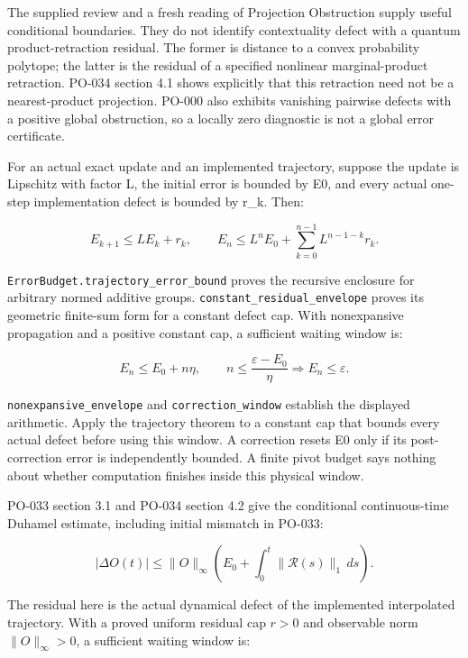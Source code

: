 \documentclass[
  10pt,
]{article}
\begin{document}
The supplied review and a fresh reading of Projection Obstruction supply useful conditional boundaries. They do not identify contextuality defect with a quantum product-retraction residual. The former is distance to a convex probability polytope; the latter is the residual of a specified nonlinear marginal-product retraction. PO-034 section 4.1 shows explicitly that this retraction need not be a nearest-product projection. PO-000 also exhibits vanishing pairwise defects with a positive global obstruction, so a locally zero diagnostic is not a global error certificate.

For an actual exact update and an implemented trajectory, suppose the update is Lipschitz with factor L, the initial error is bounded by E0, and every actual one-step implementation defect is bounded by r\_k. Then:

\protect\hypertarget{math-E0023-0029}{}{\[
E_{k+1}\le L E_k+r_k,
\qquad
E_n\le L^n E_0+\sum_{k=0}^{n-1}L^{n-1-k}r_k.
\]}

\texttt{ErrorBudget.trajectory\_error\_bound} proves the recursive enclosure for arbitrary normed additive groups. \texttt{constant\_residual\_envelope} proves its geometric finite-sum form for a constant defect cap. With nonexpansive propagation and a positive constant cap, a sufficient waiting window is:

\protect\hypertarget{math-E0024-0030}{}{\[
E_n\le E_0+n\eta,\qquad
n\le\frac{\varepsilon-E_0}{\eta}\Longrightarrow E_n\le\varepsilon.
\]}

\texttt{nonexpansive\_envelope} and \texttt{correction\_window} establish the displayed arithmetic. Apply the trajectory theorem to a constant cap that bounds every actual defect before using this window. A correction resets E0 only if its post-correction error is independently bounded. A finite pivot budget says nothing about whether computation finishes inside this physical window.

PO-033 section 3.1 and PO-034 section 4.2 give the conditional continuous-time Duhamel estimate, including initial mismatch in PO-033:

\protect\hypertarget{math-E0025-0031}{}{\[
|\Delta O(t)|\le\lVert O\rVert_\infty
\left(E_0+\int_0^t\lVert\mathcal R(s)\rVert_1\,ds\right).
\]}

The residual here is the actual dynamical defect of the implemented interpolated trajectory. With a proved uniform residual cap \protect\hypertarget{math-E0030-0032}{}{\(r>0\)} and observable norm \protect\hypertarget{math-E0031-0033}{}{\(\lVert O\rVert_\infty>0\)}, a sufficient waiting window is:
\end{document}
